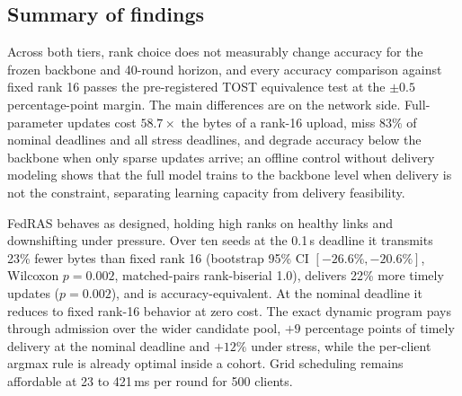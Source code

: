 \documentclass[preprint,12pt]{elsarticle}
\begin{document}
\begin{table}[t]
\centering
\caption{Component ablations, real trainer (non-IID CIFAR-10, five seeds, nominal deadline). The Min.\ column is the minimum over rounds of the per-round seed-mean accuracy in the elevated-learning-rate stability check at learning rate 0.02.}
\label{tab:ablation}
\end{table}

\subsection{Summary of findings}
\label{sec:summary}
Across both tiers, rank choice does not measurably change accuracy for the frozen backbone and 40-round horizon, and every accuracy comparison against fixed rank 16 passes the pre-registered TOST equivalence test at the $\pm0.5$ percentage-point margin. The main differences are on the network side. Full-parameter updates cost $58.7\times$ the bytes of a rank-16 upload, miss $83\%$ of nominal deadlines and all stress deadlines, and degrade accuracy below the backbone when only sparse updates arrive; an offline control without delivery modeling shows that the full model trains to the backbone level when delivery is not the constraint, separating learning capacity from delivery feasibility.

FedRAS behaves as designed, holding high ranks on healthy links and downshifting under pressure. Over ten seeds at the 0.1\,s deadline it transmits 23\% fewer bytes than fixed rank 16 (bootstrap 95\% CI $[-26.6\%, -20.6\%]$, Wilcoxon $p{=}0.002$, matched-pairs rank-biserial 1.0), delivers 22\% more timely updates ($p{=}0.002$), and is accuracy-equivalent. At the nominal deadline it reduces to fixed rank-16 behavior at zero cost. The exact dynamic program pays through admission over the wider candidate pool, $+9$ percentage points of timely delivery at the nominal deadline and $+12\%$ under stress, while the per-client argmax rule is already optimal inside a cohort. Grid scheduling remains affordable at 23 to 421\,ms per round for 500 clients.
\end{document}
